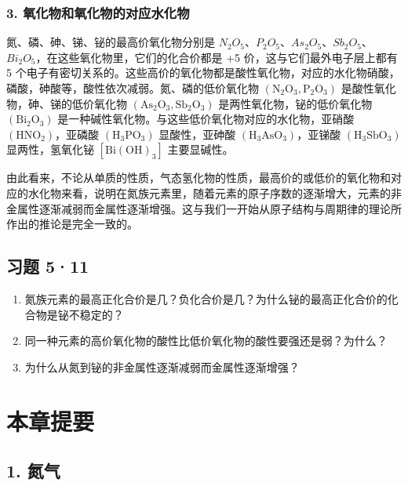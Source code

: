 \subsubsection{3. 氧化物和氧化物的对应水化物}

氮、磷、砷、锑、铋的最高价氧化物分别是
\(N_{2}O_{5}\)、\(P_{2}O_{5}\)、\(As_{2}O_{5}\)、\(Sb_{2}O_{5}\)、\(Bi_{2}O_{5}\)，在这些氧化物里，它们的化合价都是
+5 价，这与它们最外电子层上都有 5
个电子有密切关系的。这些高价的氧化物都是酸性氧化物，对应的水化物硝酸，磷酸，砷酸等，酸性依次减弱。氮、磷的低价氧化物
\(\left(\mathrm{N}_{2}\mathrm{O}_{3}, \mathrm{P}_{2}\mathrm{O}_{3}\right)\)
是酸性氧化物，砷、锑的低价氧化物
\(\left(\mathrm{As}_{2}\mathrm{O}_{3}, \mathrm{Sb}_{2}\mathrm{O}_{3}\right)\)
是两性氧化物，铋的低价氧化物
\(\left(\mathrm{Bi}_{2}\mathrm{O}_{3}\right)\)
是一种碱性氧化物。与这些低价氧化物对应的水化物，亚硝酸
\(\left(\mathrm{HNO}_{2}\right)\)，亚磷酸
\(\left(\mathrm{H}_{3}\mathrm{PO}_{3}\right)\) 显酸性，亚砷酸
\(\left(\mathrm{H}_{3}\mathrm{AsO}_{3}\right)\)，亚锑酸
\(\left(\mathrm{H}_{3}\mathrm{SbO}_{3}\right)\) 显两性，氢氧化铋
\(\left[\mathrm{Bi}(\mathrm{OH})_{3}\right]\) 主要显碱性。

由此看来，不论从单质的性质，气态氢化物的性质，最高价的或低价的氧化物和对应的水化物来看，说明在氮族元素里，随着元素的原子序数的逐渐增大，元素的非金属性逐渐减弱而金属性逐渐增强。这与我们一开始从原子结构与周期律的理论所作出的推论是完全一致的。

\subsection{习题 5·11}

\begin{enumerate}
\item
  氮族元素的最高正化合价是几？负化合价是几？为什么铋的最高正化合价的化合物是铋不稳定的？
\item
  同一种元素的高价氧化物的酸性比低价氧化物的酸性要强还是弱？为什么？
\item
  为什么从氮到铋的非金属性逐渐减弱而金属性逐渐增强？
\end{enumerate}

\section{本章提要}

\subsection{1. 氮气}

